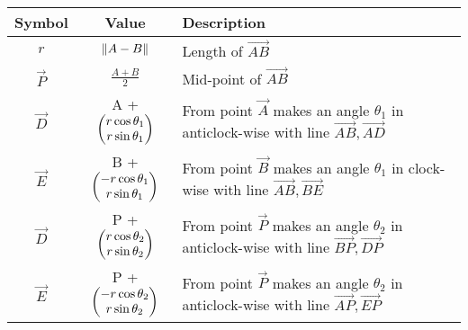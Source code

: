 \begin{tabular}{|c|c|p{5cm}|}
\hline
\textbf{Symbol} & \textbf{Value} & \textbf{Description} \\
\hline
	$r$ & $\left\lVert A-B\right\rVert$ & Length of $\vec{AB}$ \\
\hline
	$\vec{P}$ & $\frac{A+B}{2}$ & Mid-point of $\vec{AB}$ \\
\hline
	$\vec{D}$ & A + $\begin{pmatrix}r \cos \theta_1  \\ r \sin \theta_1\end{pmatrix}$ & From point $\vec{A}$ makes an angle $\theta_1$ in anticlock-wise with line $\vec{AB},\vec{AD}$  \\
\hline
	$\vec{E}$ & B + $\begin{pmatrix}-r \cos \theta_1  \\ r \sin \theta_1\end{pmatrix}$ & From point $\vec{B}$ makes an angle $\theta_1$ in clock-wise with line $\vec{AB},\vec{BE}$  \\  
\hline       
	$\vec{D}$ & P + $\begin{pmatrix}r \cos \theta_2  \\ r \sin \theta_2\end{pmatrix}$ & From point $\vec{P}$ makes an angle $\theta_2$ in anticlock-wise with line $\vec{BP},\vec{DP}$  \\  
\hline
	$\vec{E}$ & P + $\begin{pmatrix}-r \cos \theta_2  \\ r \sin \theta_2\end{pmatrix}$ & From point $\vec{P}$ makes an angle $\theta_2$ in anticlock-wise with line $\vec{AP},\vec{EP}$  \\  
\hline
\end{tabular}
